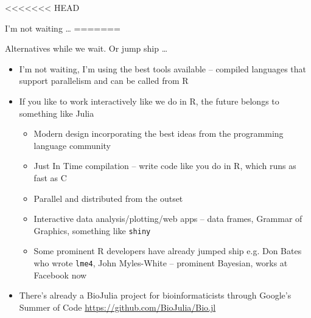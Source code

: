 \documentclass{beamer}
\begin{document}
<<<<<<< HEAD
\begin{frame}{I'm not waiting \ldots}
=======
\begin{frame}{Alternatives while we wait. Or jump ship \ldots}
\begin{itemize}
\item I'm not waiting, I'm using the best tools available -- compiled languages that support parallelism
			and can be called from R
\item If you like to work interactively like we do in R, the future belongs to something like 
			Julia
\begin{itemize}
\item Modern design incorporating the best ideas from the programming language community
\item Just In Time compilation -- write code like you do in R, which runs as fast as C
\item Parallel and distributed from the outset
\item Interactive data analysis/plotting/web apps -- data frames, Grammar of Graphics, something like
			\texttt{shiny}
\item Some prominent R developers have already jumped ship e.g. Don Bates who wrote \texttt{lme4},
			John Myles-White -- prominent Bayesian, works at Facebook now
\end{itemize}
\item There's already a BioJulia project for bioinformaticists through Google's Summer of Code
			\url{https://github.com/BioJulia/Bio.jl}
\end{itemize}
\end{frame}



\end{frame}
\end{document}
